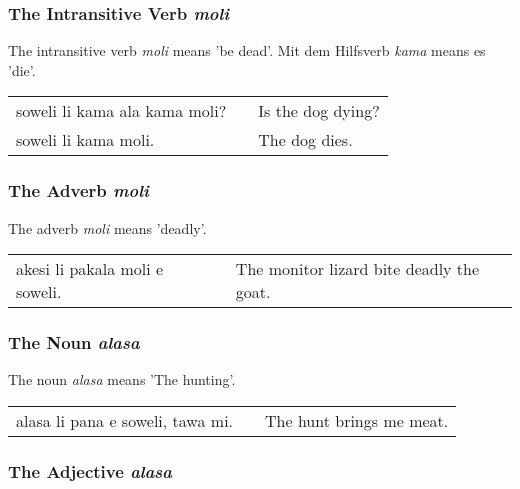 \subsubsection*{The Intransitive Verb \textit{moli}}
%
%

The intransitive verb \textit{moli} means 'be dead'.
Mit dem Hilfsverb \textit{kama} means es 'die'. 

\begin{supertabular}{p{5,5cm}|ll}
soweli li kama ala kama moli? && Is the dog dying? \\
soweli li kama moli. && The dog dies. \\
\end{supertabular} 

%
%
\subsubsection*{The Adverb \textit{moli}}
%
%
The adverb \textit{moli} means 'deadly'. 

\begin{supertabular}{p{5,5cm}|ll}
akesi li pakala moli e soweli. && The monitor lizard bite deadly the goat. \\
\end{supertabular} 

%
%
\subsubsection*{The Noun \textit{alasa}}
%

The noun \textit{alasa} means 'The hunting'.

\begin{supertabular}{p{5,5cm}|ll}
alasa li pana e soweli, tawa mi. && The hunt brings me meat.\\
\end{supertabular}

%
\subsubsection*{The Adjective \textit{alasa}}
%


